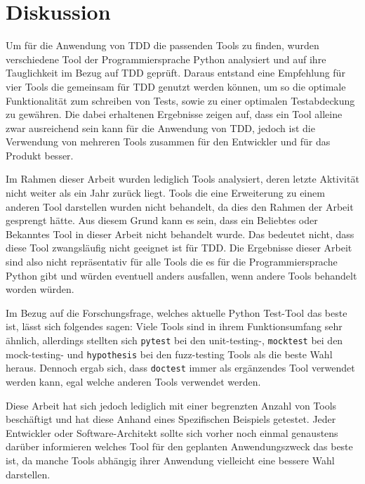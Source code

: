 \section{Diskussion}\label{diskussion}
Um für die Anwendung von TDD die passenden Tools zu finden, wurden verschiedene
Tool der Programmiersprache Python analysiert und auf ihre Tauglichkeit im
Bezug auf TDD geprüft. Daraus entstand eine Empfehlung für vier Tools die
gemeinsam für TDD genutzt werden können, um so die optimale Funktionalität zum
schreiben von Tests, sowie zu einer optimalen Testabdeckung zu gewähren. Die 
dabei erhaltenen Ergebnisse zeigen auf, dass ein Tool alleine zwar ausreichend 
sein kann für die Anwendung von TDD, jedoch ist die Verwendung von mehreren 
Tools zusammen für den Entwickler und für das Produkt besser.

Im Rahmen dieser Arbeit wurden lediglich Tools analysiert, deren letzte
Aktivität nicht weiter als ein Jahr zurück liegt. Tools die eine Erweiterung zu
einem anderen Tool darstellen wurden nicht behandelt, da dies den Rahmen der
Arbeit gesprengt hätte. Aus diesem Grund kann es sein, dass ein Beliebtes oder
Bekanntes Tool in dieser Arbeit nicht behandelt wurde. Das bedeutet nicht, dass
diese Tool zwangsläufig nicht geeignet ist für TDD. Die Ergebnisse dieser
Arbeit sind also nicht repräsentativ für alle Tools die es für die
Programmiersprache Python gibt und würden eventuell anders ausfallen, wenn
andere Tools behandelt worden würden.

Im Bezug auf die Forschungsfrage, welches aktuelle Python Test-Tool das beste 
ist, lässt sich folgendes sagen: Viele Tools sind in ihrem Funktionsumfang sehr 
ähnlich, allerdings stellten sich \lstinline{pytest} bei den unit-testing-, 
\lstinline{mocktest} bei den mock-testing- und \lstinline{hypothesis} bei den 
fuzz-testing Tools als die beste Wahl heraus. Dennoch ergab sich, dass 
\lstinline{doctest} immer als ergänzendes Tool verwendet werden kann, egal 
welche anderen Tools verwendet werden.

Diese Arbeit hat sich jedoch lediglich mit einer begrenzten Anzahl von Tools 
beschäftigt und hat diese Anhand eines Spezifischen Beispiels getestet. Jeder 
Entwickler oder Software-Architekt sollte sich vorher noch einmal genaustens 
darüber informieren welches Tool für den geplanten Anwendungszweck das beste 
ist, da manche Tools abhängig ihrer Anwendung vielleicht eine bessere Wahl 
darstellen.